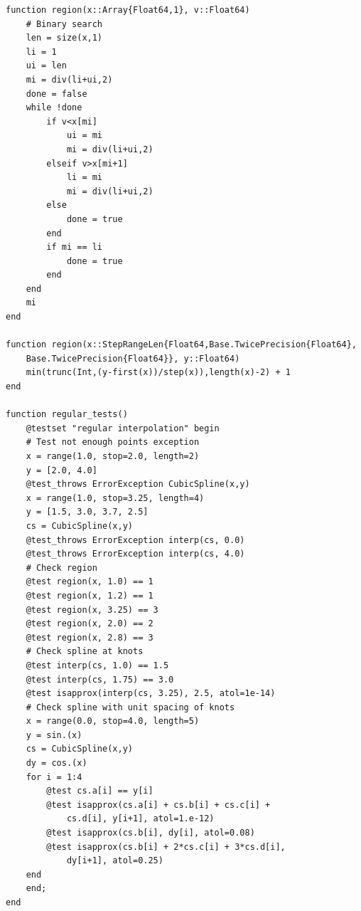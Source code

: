 \documentclass{scrartcl}
\begin{document}
\begin{lstlisting}
function region(x::Array{Float64,1}, v::Float64)
    # Binary search
    len = size(x,1)
    li = 1
    ui = len
    mi = div(li+ui,2)
    done = false
    while !done
        if v<x[mi]
            ui = mi
            mi = div(li+ui,2)
        elseif v>x[mi+1]
            li = mi
            mi = div(li+ui,2)
        else
            done = true
        end
        if mi == li
            done = true
        end
    end
    mi
end

function region(x::StepRangeLen{Float64,Base.TwicePrecision{Float64},
	Base.TwicePrecision{Float64}}, y::Float64)
    min(trunc(Int,(y-first(x))/step(x)),length(x)-2) + 1
end

function regular_tests()
    @testset "regular interpolation" begin
    # Test not enough points exception
    x = range(1.0, stop=2.0, length=2)
    y = [2.0, 4.0]
    @test_throws ErrorException CubicSpline(x,y)
    x = range(1.0, stop=3.25, length=4)
    y = [1.5, 3.0, 3.7, 2.5]
    cs = CubicSpline(x,y)
    @test_throws ErrorException interp(cs, 0.0)
    @test_throws ErrorException interp(cs, 4.0)
    # Check region
    @test region(x, 1.0) == 1
    @test region(x, 1.2) == 1
    @test region(x, 3.25) == 3
    @test region(x, 2.0) == 2
    @test region(x, 2.8) == 3
    # Check spline at knots
    @test interp(cs, 1.0) == 1.5
    @test interp(cs, 1.75) == 3.0
    @test isapprox(interp(cs, 3.25), 2.5, atol=1e-14)
    # Check spline with unit spacing of knots
    x = range(0.0, stop=4.0, length=5)
    y = sin.(x)
    cs = CubicSpline(x,y)
    dy = cos.(x)
    for i = 1:4
        @test cs.a[i] == y[i]
        @test isapprox(cs.a[i] + cs.b[i] + cs.c[i] +
        	cs.d[i], y[i+1], atol=1.e-12)
        @test isapprox(cs.b[i], dy[i], atol=0.08)
        @test isapprox(cs.b[i] + 2*cs.c[i] + 3*cs.d[i],
        	dy[i+1], atol=0.25)
    end
    end;
end


\end{lstlisting}
\end{document}
